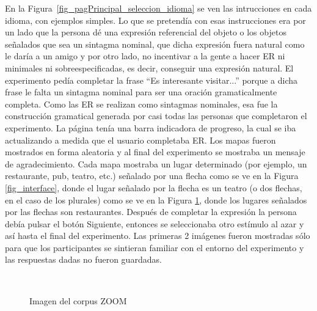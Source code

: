  En la Figura~\ref{fig_pagPrincipal_seleccion_idioma} se ven las intrucciones en cada idioma, con ejemplos simples. Lo que se pretend\'ia con esas instrucciones era por un lado que la persona d\'e una expresi\'on referencial del objeto o los objetos se\~nalados que sea un sintagma nominal, que dicha expresi\'on fuera natural como le dar\'ia a un amigo y por otro lado, no incentivar a la gente a hacer ER ni minimales ni sobreespecificadas, es decir, conseguir una expresi\'on natural. 
El experimento ped\'ia completar la frase ``Es interesante visitar...'' porque a dicha frase le falta un sintagma nominal para ser una oraci\'on gramaticalmente completa. Como las ER se realizan como sintagmas nominales, esa fue la construcci\'on gramatical generada por casi todas las personas que completaron el experimento.
La p\'agina ten\'{i}a una barra indicadora de progreso, la cual se iba actualizando a medida que el usuario completaba ER. Los mapas fueron mostrados en forma aleatoria y al final del experimento se mostraba un mensaje de agradecimiento.
Cada mapa mostraba un lugar determinado (por ejemplo, un restaurante, pub, teatro, etc.) se\~nalado por una flecha como se ve en la Figura \ref{fig_interface}, donde el lugar se\~nalado por la flecha es un teatro (o dos flechas, en el caso de los plurales) como se ve en la Figura \ref{mapa20}, donde los lugares se\~nalados por las flechas son restaurantes. Despu\'es de completar la expresi\'on la persona deb\'ia pulsar el bot\'on Siguiente, entonces se seleccionaba otro est\'{i}mulo al azar y as\'{i} hasta el final del experimento. Las primeras 2 im\'agenes fueron mostradas s\'olo para que los participantes se sintieran familiar con el entorno del experimento y las respuestas dadas no fueron guardadas.

\begin{figure}[ht]
\begin{center}
\\[0pt]
\caption{Imagen del corpus ZOOM}
\label{mapa20}
\end{center}
\end{figure}

